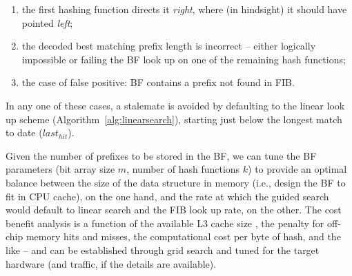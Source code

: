 \documentclass[conference,compsoc]{IEEEtran}
\begin{document}
\begin{enumerate}
  \item the first hashing function directs it \emph{right}, where
    (in hindsight) it should have pointed \emph{left};
  \item the decoded best matching prefix length is incorrect -- either
    logically impossible or failing the BF look up on one of the
    remaining hash functions;
  \item the case of false positive: BF contains a prefix not found in
    FIB.
\end{enumerate}

In any one of these cases, a stalemate is avoided by defaulting to the 
linear look up scheme (Algorithm~\ref{alg:linearsearch}), starting
just below the longest match to date ($last_{hit}$).

Given the number of prefixes to be stored in the BF, we can tune the BF 
parameters (bit array size $m$, number of hash functions $k$) to provide
an optimal balance between the size of the data structure in memory (i.e.,
design the BF to fit in CPU cache), on the one hand, and the rate at which
the guided search would default to linear search and the FIB look up 
rate, on the other. The cost benefit analysis is a
function of the available L3 cache size , the penalty for off-chip memory 
hits and misses, the computational cost per byte of hash, and the like --
and can be established through grid search and tuned for the target 
hardware (and traffic, if the details are available).
\end{document}
